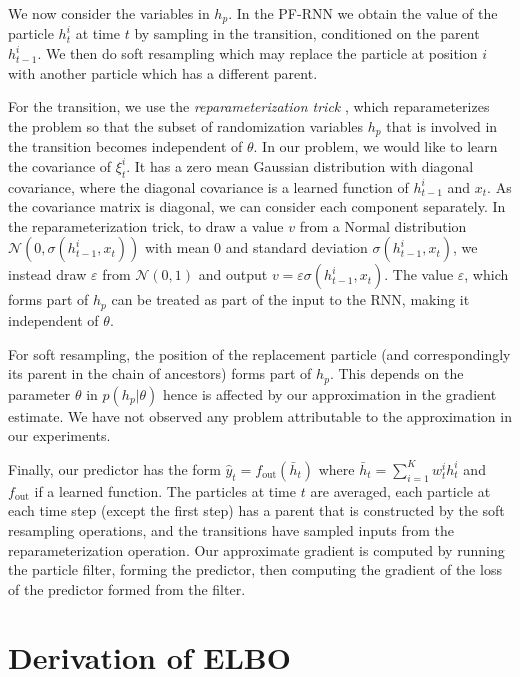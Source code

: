 \documentclass[letterpaper]{article} %
\begin{document}
We now consider the variables in $h_p$. In the PF-RNN we
obtain the value of the particle $h_t^i$ at time $t$ by sampling in the transition, conditioned on the parent $h_{t-1}^i$. 
We then do soft resampling which may replace the particle at position $i$ with another particle which has a different parent. 

For the transition, we use the \emph{reparameterization trick} \cite{kingma2013auto}, which reparameterizes the problem so that the subset of randomization variables $h_p$ that is involved in the transition becomes independent of $\theta$. In our problem, we would like to learn the covariance of $\xi_t^i$. It has a zero mean Gaussian distribution with diagonal covariance, where the diagonal covariance is a learned function of $h_{t-1}^i$ and $x_t$. As the covariance matrix is diagonal, we can consider each component separately. In the reparameterization trick, to draw a value $v$ from a Normal distribution $\mathcal{N}(0,\sigma(h_{t-1}^i,x_t))$ with mean 0 and standard deviation $\sigma(h_{t-1}^i,x_t)$, we instead draw $\varepsilon$ from $\mathcal{N}(0,1)$ and output $v=\varepsilon\sigma(h_{t-1}^i,x_t)$. The value $\varepsilon$, which forms part of $h_p$ can be treated as part of the input to the RNN, making it independent of $\theta$.

For soft resampling, the position of the replacement particle (and correspondingly its parent in the chain of ancestors) forms part of $h_p$. This depends on the parameter $\theta$ in $p(h_p|\theta)$ hence is affected by our approximation in the gradient estimate. We have not observed any problem attributable to the approximation in our experiments.

Finally, our predictor has the form $\hat{y}_t = f_\mathrm{out}(\bar{h}_t)$ where $\bar{h}_t = \sum_{i=1}^K w_t^i h_t^i$ and $f_\mathrm{out}$ if a learned function. The particles at time $t$ are averaged, each particle at each time step (except the first step) has a parent that is constructed by the soft resampling operations, and the transitions have sampled inputs from the reparameterization operation. Our approximate gradient is computed by running the particle filter, forming the predictor, then computing the gradient of the loss of the predictor formed from the filter.  

\section{Derivation of ELBO}\label{sec:elbo}
\end{document}
